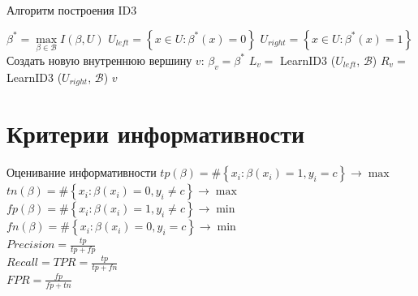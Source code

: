 \documentclass[10pt]{beamer}
\begin{document}
{
\begin{frame}{Алгоритм построения ID3}
  \begin{algorithmic}[1]
         \State {}
       \EndIf
       \State $\beta^* = \max\limits_{\beta \in \mathscr{B}} I(\beta, U)$
       \State $U_{left} = \left\{ x \in U : \beta^*(x) = 0\right\}$	
       \State $U_{right} = \left\{ x \in U : \beta^*(x) = 1\right\}$	
         \State {}
       \EndIf
       \State Создать новую внутреннюю вершину $v$: $\beta_v = \beta^*$
       \State $L_v =$ LearnID3 ($U_{left}$, $\mathscr{B}$)
       \State $R_v =$ LearnID3 ($U_{right}$, $\mathscr{B}$)
       \State \Return $v$
    \EndFunction
  \end{algorithmic}    
\end{frame}
}

\section{Критерии информативности}

\begin{frame}{Оценивание информативности}
	${ tp(\beta) = \# \left\{ x_i: \beta(x_i) = 1 , y_i = c \right\} \rightarrow \max  }$ \\
  ${ tn(\beta) = \# \left\{ x_i: \beta(x_i) = 0 , y_i \neq c \right\} \rightarrow \max  }$ \\
	${ fp(\beta) = \# \left\{ x_i: \beta(x_i) = 1 , y_i \neq c \right\} \rightarrow \min}$ \\
	${ fn(\beta) = \# \left\{ x_i: \beta(x_i) = 0 , y_i = c \right\} \rightarrow \min}$ \\
	\bigbreak
	\pause
	$Precision = \frac{tp}{tp+fp}$\\
  $Recall = TPR = \frac{tp}{tp + fn}$\\
  $FPR = \frac{fp}{fp+tn}$\\
\end{frame}
\end{document}
